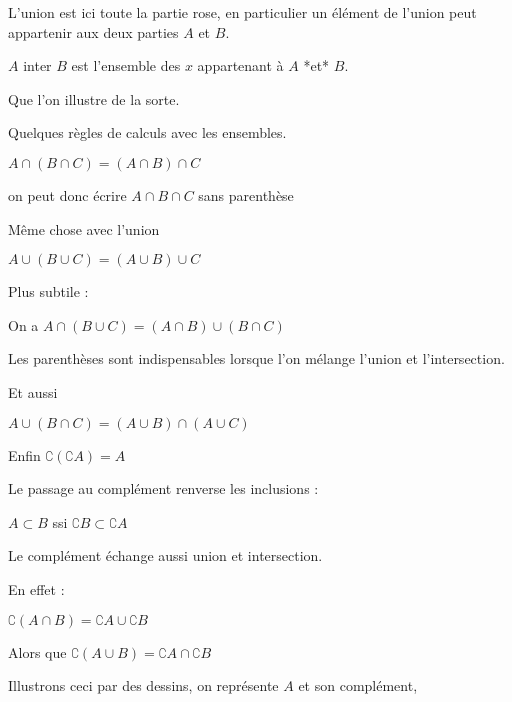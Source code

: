 \change

L'union est ici toute la partie rose, en particulier un élément de l'union peut
appartenir aux deux parties $A$ et $B$. 

\change

$A$ inter $B$ est l'ensemble des $x$ appartenant à $A$ *et* $B$.

\change

Que l'on illustre de la sorte.

\diapo

Quelques règles de calculs avec les ensembles.

$A \cap (B \cap C) = (A \cap B) \cap C$ 

on peut donc écrire $A\cap B \cap C$ sans parenthèse

\change

Même chose avec l'union

$A \cup (B \cup C) = (A \cup B) \cup C$  


\change

Plus subtile :

On a 
 $A \cap (B \cup C) = (A \cap B) \cup (B \cap C)$

Les parenthèses sont indispensables lorsque l'on mélange l'union et l'intersection.

\change

Et aussi

 $A \cup (B \cap C) = (A \cup B) \cap (A \cup C)$

\change

Enfin  $\complement \left( \complement A \right) = A$

\change

Le passage au complément renverse les inclusions :

$A \subset B$ ssi $\complement B \subset \complement A$



\diapo


Le complément échange aussi union et intersection.

En effet :

$\complement \left( A \cap B \right) = \complement A \cup \complement B$ 

\change

Alors que 
$\complement \left( A \cup B \right) = \complement A \cap \complement B$

\change

Illustrons ceci par des dessins, on représente $A$ et son complément,

